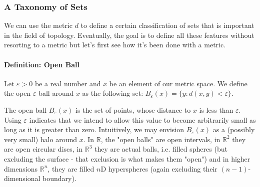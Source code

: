 





\subsubsection{A Taxonomy of Sets}
We can use the metric $d$ to define a certain classification of sets that is important in the field of topology. Eventually, the goal is to define all these features without resorting to a metric but let's first see how it's been done with a metric.


\paragraph{Definition: Open Ball} Let $\varepsilon > 0$ be a real number and $x$ be an element of our metric space.  We define the open $\varepsilon$-ball around $x$ as the following set: $B_\varepsilon(x) = \{ y : d(x,y) < \varepsilon \}$.

\medskip
The open ball $B_\varepsilon(x)$ is the set of points, whose distance to $x$ is less than $\varepsilon$. Using $\varepsilon$ indicates that we intend to allow this value to become arbitrarily small as long as it is greater than zero. Intuitively, we may envision $B_\varepsilon(x)$ as a (possibly very small) halo around $x$. In $\mathbb{R}$, the "open balls" are open intervals, in $\mathbb{R}^2$ they are open circular discs, in $\mathbb{R}^3$ they are actual balls, i.e. filled spheres (but excluding the surface - that exclusion is what makes them "open") and in higher dimensions $\mathbb{R}^n$, they are filled $n$D hyperspheres (again excluding their $(n-1)$-dimensional boundary).

